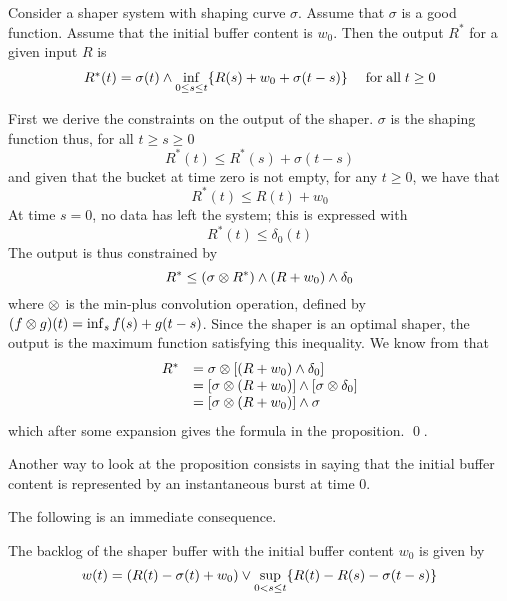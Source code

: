 \begin{proposition}
 Consider a shaper system with shaping curve
$\sigma$. Assume that $\sigma$ is a good function.  Assume that
the initial buffer content is $w_0$. Then the output $R^*$ for a
given input $R$ is
\begin{equation}
\mylabel{l23b-enzb}
\begin{array}{lr}
R^*(t)= \sigma(t) \wedge \displaystyle\inf_{0 \leq s \leq t} \{
R(s) + w_0 + \sigma(t-s) \}& \mfa t \geq 0
\end{array}
\end{equation}
\end{proposition}
\pr First we derive the constraints on the output of the shaper.
$\sigma$ is the shaping function thus, for all $t \geq s \geq 0$
\[
R^*(t) \leq R^*(s) + \sigma(t-s)
\]
and given that the bucket at time zero is not empty, for any $t
\geq 0$, we have that
\[
R^*(t) \leq R(t) +  w_0
\]
At time $s=0$, no data has left the system; this is expressed with
\[
R^*(t) \leq \delta_0(t)
\]
The output is thus constrained by
$$
R^{*}\leq (\sigma \otimes R^{*}) \wedge (R + w_{0}) \wedge \delta_{0}
$$
where $\otimes$ is the min-plus convolution operation, defined by $(f
\otimes g) (t) = \inf_{s} f(s) + g(t-s)$. Since the shaper is an
optimal shaper, the output is the maximum function satisfying this
inequality. We know from  that
\[
\begin{array}{ll}
R^* & = \sigma \otimes [(R+w_0)\wedge \delta_0]\\ &= [\sigma \otimes
(R+w_0)] \wedge [\sigma \otimes \delta_0]\\ &= [\sigma \otimes (R+w_0)]
\wedge \sigma
\end{array}
\]
which after some expansion gives the formula in the proposition.
\qed.

Another way to look at the proposition consists in saying that the
initial buffer content is represented by an instantaneous burst at
time $0$.

The following is an immediate consequence.
\begin{corollary}
 The backlog of the shaper buffer with the
initial buffer content $w_0$ is given by
\begin{equation}
w(t)= \left(R(t)- \sigma(t) + w_0 \right) \vee \sup_{0 < s\leq t}
\{R(t)-R(s)-\sigma(t-s)\} \mylabel{l23b-elb}
\end{equation}
\end{corollary}


